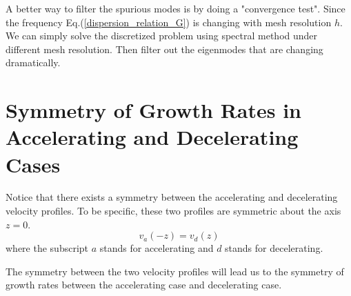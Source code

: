 A better way to filter the spurious modes is by doing a "convergence test". Since the frequency Eq.(\ref{dispersion_relation_G}) is changing with mesh resolution $h$. We can simply solve the discretized problem using spectral method under different mesh resolution. Then filter out the eigenmodes that are changing dramatically.

\section{Symmetry of Growth Rates in Accelerating and Decelerating Cases}
Notice that there exists a symmetry between the accelerating and decelerating velocity profiles. To be specific, these two profiles are symmetric about the axis $z=0$.
\[ v_a(-z) = v_d(z) \]
where the subscript $a$ stands for accelerating and $d$ stands for decelerating.

The symmetry between the two velocity profiles will lead us to the symmetry of growth rates between the accelerating case and decelerating case. 

